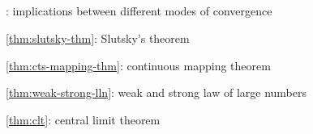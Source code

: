\subsection*{}
\item {}: implications between different modes of convergence
\item \cref{thm:slutsky-thm}: Slutsky's theorem
\item \cref{thm:cts-mapping-thm}: continuous mapping theorem
\item \cref{thm:weak-strong-lln}: weak and strong law of large numbers
\item \cref{thm:clt}: central limit theorem
